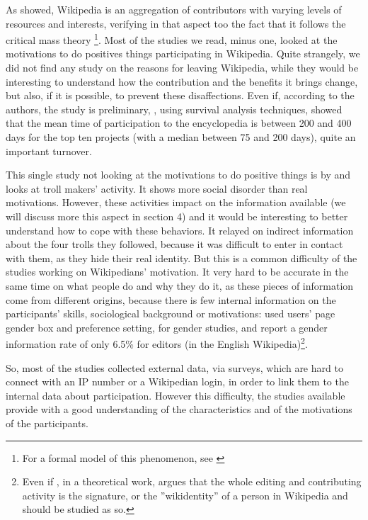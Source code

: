 
As \citet{PrasarnphanichWagner11} showed, Wikipedia is an aggregation
of contributors with varying levels of resources and interests, verifying
in that aspect too the fact that it follows the critical mass theory
\citep{MarwellOliver93}\footnote{For a formal model of this phenomenon, see \citet{Rahman08}}.
Most of the studies we read, minus one, looked at the motivations
to do positives things participating in Wikipedia. Quite strangely,
we did not find any study on the reasons for leaving Wikipedia, while
they would be interesting to understand how the contribution and the
benefits it brings change, but also, if it is possible, to prevent
these disaffections. Even if, according to the authors, the study
is preliminary, \citet{OrtegaIzquierdo-Cortazar09}, using survival
analysis techniques, showed that the mean time of participation to
the encyclopedia is between 200 and 400 days for the top ten projects
(with a median between 75 and 200 days), quite an important turnover.

This single study not looking at the motivations to do positive things
is by \citet{ShachafHara10} and looks at troll makers' activity.
It shows more social disorder than real motivations. However, these
activities impact on the information available (we will discuss more
this aspect in section 4) and it would be interesting to better understand
how to cope with these behaviors. It relayed on indirect information
about the four trolls they followed, because it was difficult to enter
in contact with them, as they hide their real identity. But this is
a common difficulty of the studies working on Wikipedians' motivation.
It very hard to be accurate in the same time on what people do and
why they do it, as these pieces of information come from different
origins, because there is few internal information on the participants'
skills, sociological background or motivations: \citet{Lametal11}
used users' page gender box and preference setting, for gender studies,
and report a gender information rate of only 6.5\% for editors (in
the English Wikipedia)\footnote{Even if \citet{Ashton11}, in a theoretical work, argues that the
whole editing and contributing activity is the signature, or the ''wikidentity''
\citep[term from ][]{MallanGiardina09} of a person in Wikipedia and
should be studied as so.}. 

So, most of the studies collected external data, via surveys, which
are hard to connect with an IP number or a Wikipedian login, in order
to link them to the internal data about participation. However this
difficulty, the studies available provide with a good understanding
of the characteristics and of the motivations of the participants.

